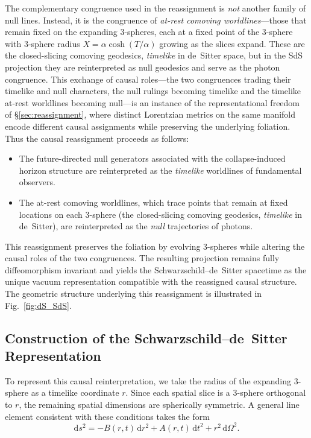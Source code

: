 \documentclass[11pt,a4paper]{article}
\theoremstyle{plain}
\theoremstyle{definition}
\theoremstyle{remark}
\begin{document}
The complementary congruence used in the reassignment is \emph{not} another family of null lines. Instead, it is the congruence of \emph{at-rest comoving worldlines}---those that remain fixed on the expanding 3-spheres, each at a fixed point of the $3$-sphere with $3$-sphere radius $X=\alpha\cosh(T/\alpha)$ growing as the slices expand. These are the closed-slicing comoving geodesics, \emph{timelike} in de~Sitter space, but in the SdS projection they are reinterpreted as null geodesics and serve as the photon congruence. This exchange of causal roles---the two congruences trading their timelike and null characters, the null rulings becoming timelike and the timelike at-rest worldlines becoming null---is an instance of the representational freedom of \S\ref{sec:reassignment}, where distinct Lorentzian metrics on the same manifold encode different causal assignments while preserving the underlying foliation. Thus the causal reassignment proceeds as follows:
\begin{itemize}
    \item The future-directed null generators associated with the collapse-induced horizon structure are reinterpreted as the \emph{timelike} worldlines of fundamental observers.
    \item The at-rest comoving worldlines, which trace points that remain at fixed locations on each 3-sphere (the closed-slicing comoving geodesics, \emph{timelike} in de~Sitter), are reinterpreted as the \emph{null} trajectories of photons.
\end{itemize}

This reassignment preserves the foliation by evolving 3-spheres while altering the causal roles of the two congruences. The resulting projection remains fully diffeomorphism invariant and yields the Schwarzschild--de~Sitter spacetime as the unique vacuum representation compatible with the reassigned causal structure. The geometric structure underlying this reassignment is illustrated in Fig.~\ref{fig:dS_SdS}.

\subsection{Construction of the Schwarzschild--de~Sitter Representation}

To represent this causal reinterpretation, we take the radius of the expanding 3-sphere as a timelike coordinate $r$. Since each spatial slice is a 3-sphere orthogonal to $r$, the remaining spatial dimensions are spherically symmetric. A general line element consistent with these conditions takes the form
\begin{equation}
    \mathrm{d}s^2=-B(r,t)\,\mathrm{d}r^2
    +A(r,t)\,\mathrm{d}t^2+r^2\,\mathrm{d}\Omega^2.
\end{equation}
\end{document}
